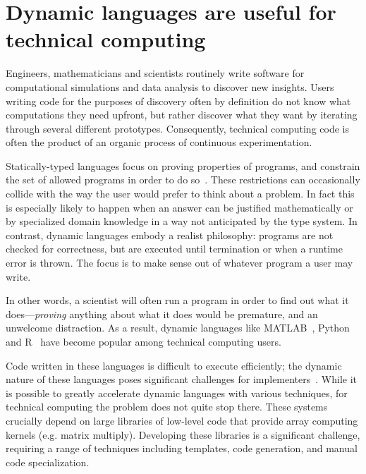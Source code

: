 \documentclass[pldi]{sigplanconf-pldi15}
\begin{document}

\section{Dynamic languages are useful for technical computing}

Engineers, mathematicians and scientists routinely write software for
computational simulations and data analysis to discover new insights.
Users writing code for the purposes of discovery often by definition do not
know what computations they need upfront, but rather discover what they want by
iterating through several different prototypes. Consequently, technical
computing code is often the product of an organic process of continuous
experimentation.

Statically-typed languages focus on proving properties of programs, and constrain
the set of allowed programs in order to do so~\cite{Pierce2002}.
These restrictions can occasionally collide with the way the user would
prefer to think about a problem. In fact this is especially likely to happen
when an answer can be justified mathematically or by specialized domain
knowledge in a way not anticipated by the type system.
In contrast,
dynamic languages embody a realist philosophy: programs are not checked for
correctness, but are executed until termination or when a runtime error is
thrown. The focus is to make sense out of whatever program a user may write.

In other words, a scientist will often run a program in order to find out what
it does---\emph{proving} anything about what it does would be premature, and an
unwelcome distraction. As a result, dynamic languages like
MATLAB~\cite{matlab}, Python~\cite{pythonlib,pythonref} and R~\cite{rlang} have
become popular among technical computing users.

Code written in these languages is difficult to execute efficiently;
the dynamic nature of these languages poses significant challenges for
implementers~\cite{Joisha2001,Joisha2006,Seljebotn2009}. While it is possible
to greatly accelerate dynamic languages with various techniques, for
technical computing the problem does not quite stop there. These systems
crucially depend on large libraries of low-level code that provide array
computing kernels (e.g. matrix multiply). Developing these libraries is a
significant challenge, requiring a range of techniques including templates,
code generation, and manual code specialization.
\end{document}
